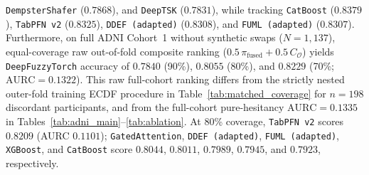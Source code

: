 \documentclass[10pt,twocolumn]{article}
\begin{document}
\texttt{DempsterShafer} ($0.7868$), and \texttt{DeepTSK} ($0.7831$), while tracking
\texttt{CatBoost} ($0.8379$), \texttt{TabPFN~v2} ($0.8325$), \texttt{DDEF (adapted)}
($0.8308$), and \texttt{FUML (adapted)} ($0.8307$). Furthermore, on full ADNI Cohort~1 without
synthetic swaps ($N=1,137$), equal-coverage raw
out-of-fold composite ranking ($0.5\,\pi_{\text{fused}}+0.5\,C_{\mathcal{O}}$) yields
\texttt{DeepFuzzyTorch} accuracy of $0.7840$ (90\%), $0.8055$ (80\%), and $0.8229$ (70\%;
$\text{AURC}=0.1322$). This raw full-cohort ranking differs from the strictly nested outer-fold
training ECDF procedure in Table~\ref{tab:matched_coverage} for $n=198$ discordant
participants,
and from the full-cohort pure-hesitancy $\text{AURC}=0.1335$ in
Tables~\ref{tab:adni_main}--\ref{tab:ablation}. At 80\% coverage, \texttt{TabPFN~v2} scores
$0.8209$ (AURC $0.1101$); \texttt{GatedAttention}, \texttt{DDEF (adapted)},
\texttt{FUML (adapted)}, \texttt{XGBoost}, and \texttt{CatBoost} score $0.8044$, $0.8011$,
$0.7989$, $0.7945$, and $0.7923$, respectively.
\end{document}
